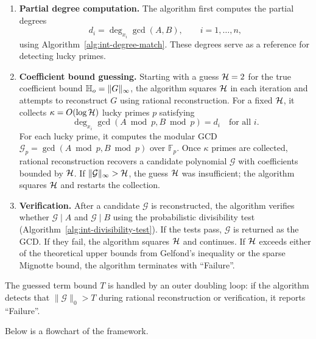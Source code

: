 \documentclass{article}
\numberwithin{equation}{section}
\begin{document}
\begin{enumerate}
    \item \textbf{Partial degree computation.} The algorithm first computes the partial degrees
    \[
    d_i = \deg_{x_i} \gcd(A,B), \qquad i=1,\dots,n,
    \]
    using Algorithm~\ref{alg:int-degree-match}. These degrees serve as a reference for detecting lucky primes.

    \item \textbf{Coefficient bound guessing.} Starting with a guess ${\mathcal{H}} = 2$ for the true coefficient bound $\mathbb{H}_{o} = \|G\|_\infty$, the algorithm squares ${\mathcal{H}}$ in each iteration and attempts to reconstruct $G$ using rational reconstruction. For a fixed ${\mathcal{H}}$, it collects $\kappa = O(\log {\mathcal{H}})$ lucky primes $p$ satisfying
    \[
    \deg_{x_i} \gcd(A \bmod p, B \bmod p) = d_i \quad \text{for all } i.
    \]
    For each lucky prime, it computes the modular GCD $\mathcal{G}_p = \gcd(A \bmod p, B \bmod p)$ over $\mathbb{F}_p$. Once $\kappa$ primes are collected, rational reconstruction recovers a candidate polynomial $\mathcal{G}$ with coefficients bounded by ${\mathcal{H}}$. If $\|\mathcal{G}\|_\infty > {\mathcal{H}}$, the guess ${\mathcal{H}}$ was insufficient; the algorithm squares ${\mathcal{H}}$ and restarts the collection.

    \item \textbf{Verification.} After a candidate $\mathcal{G}$ is reconstructed, the algorithm verifies whether $\mathcal{G} \mid A$ and $\mathcal{G} \mid B$ using the probabilistic divisibility test (Algorithm~\ref{alg:int-divisibility-test}). If the tests pass, $\mathcal{G}$ is returned as the GCD. If they fail, the algorithm squares ${\mathcal{H}}$ and continues. If ${\mathcal{H}}$ exceeds either of the theoretical upper bounds from Gelfond's inequality or the sparse Mignotte bound, the algorithm terminates with ``Failure''.
\end{enumerate}

The guessed term bound $T$ is handled by an outer doubling loop: if the algorithm detects that $\|\mathcal{G}\|_0 > T$ during rational reconstruction or verification, it reports ``Failure''.

Below is a flowchart of the framework.
\end{document}

